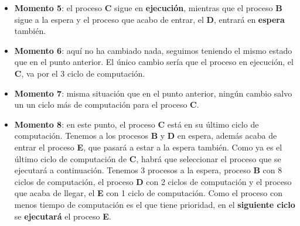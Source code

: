\begin{enumerate}
\begin{itemize}
        \item \textbf{Momento 5}: el proceso \textbf{C} sigue en \textbf{ejecución}, mientras que el proceso \textbf{B} sigue a la espera y el proceso que acabo de entrar, el \textbf{D}, entrará en \textbf{espera} también.

        \item \textbf{Momento 6}: aquí no ha cambiado nada, seguimos teniendo el mismo estado que en el punto anterior. El único cambio sería que el proceso en ejecución, el \textbf{C}, va por el 3 ciclo de computación.

        \item \textbf{Momento 7}: misma situación que en el punto anterior, ningún cambio salvo un un ciclo más de computación para el proceso \textbf{C}.

        \item \textbf{Momento 8}: en este punto, el proceso \textbf{C} está en su último ciclo de computación. Tenemos a los procesos \textbf{B} y \textbf{D} en espera, además acaba de entrar el proceso \textbf{E}, que pasará a estar a la espera también.  Como ya es el último ciclo de computación de \textbf{C}, habrá que seleccionar el proceso que se ejecutará a continuación. Tenemos 3 procesos a la espera, proceso \textbf{B} con 8 ciclos de computación, el proceso \textbf{D} con 2 ciclos de computación y el proceso que acaba de llegar, el \textbf{E} con 1 ciclo de computación. Como el proceso con menos tiempo de computación es el que tiene prioridad, en el \textbf{siguiente ciclo} se \textbf{ejecutará} el proceso \textbf{E}.
    \end{itemize}
\end{enumerate}

\newpage




